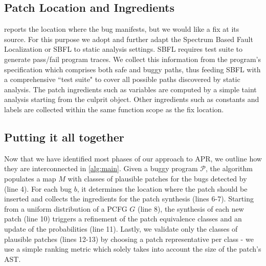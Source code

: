 \subsection{Patch Location and Ingredients}\label{ssec:location}
\pulse reports the location where the bug manifests, but we would like a fix at its source. For this purpose we adopt and further adapt 
the Spectrum Based Fault Localization or SBFL \cite{sbfl} to static analysis settings.
SBFL requires test suite to generate pass/fail program traces. 
We collect this information from the program's specification which comprises both safe and buggy paths, thus feeding
SBFL with a comprehensive ``test suite" to cover all possible paths discovered by static analysis. 
The patch ingredients such as variables are computed by a simple taint analysis starting from the culprit object. Other ingredients such as constants and labels are collected within the same function scope as the fix location.

\subsection{Putting it all together} 
Now that we have identified most phases of our approach to APR, we
outline how they are interconnected in \autoref{alg:main}. Given a buggy program 
 $\mathcal{P}$, the algorithm populates a map $M$ with classes of plausible patches for the bugs detected by 
 \pulse (line 4). For each bug $b$, it determines the location where the patch should be inserted
 and collects the ingredients for the patch synthesis (lines 6-7). 
 Starting from a uniform distribution 
 of a PCFG $G$ (line 8), the synthesis of each new patch (line 10) triggers
 a refinement of the patch equivalence classes and an update of the probabilities (line 11). Lastly, we validate only the classes of plausible patches (lines 12-13) 
 by choosing a patch representative per class - we use a simple ranking metric which solely takes into account the size of the patch's AST.
 
